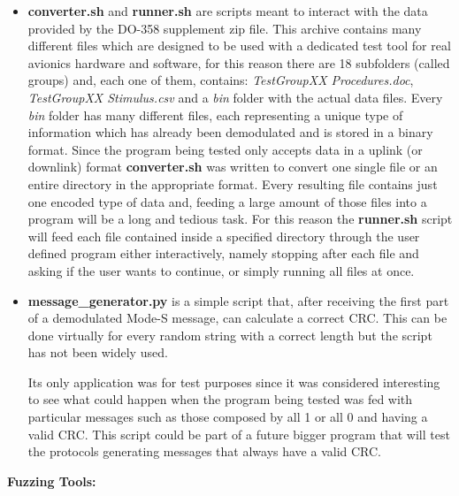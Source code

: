 \documentclass[../main.tex]{subfiles}
\begin{document}
\begin{itemize}

  \item \textbf{converter.sh} and \textbf{runner.sh} are scripts meant to
  interact with the data provided by the DO-358 supplement zip file. This
  archive contains many different files which are designed to be used with a
  dedicated test tool for real avionics hardware and software, for this reason
  there are 18 subfolders (called groups) and,  each one of them, contains:
  \textit{TestGroupXX Procedures.doc}, \textit{TestGroupXX Stimulus.csv} and a
  \textit{bin} folder with the actual data files. Every \textit{bin} folder has
  many different files, each representing a unique type of information which has
  already been demodulated and is stored in a binary format. Since the program
  being tested only accepts data in a uplink (or downlink) format
  \textbf{converter.sh} was written to convert one single file or an entire
  directory in the appropriate format. Every resulting file contains just one
  encoded type of data and, feeding a large amount of those files into a
  program will be a long and tedious task. For this reason the
  \textbf{runner.sh} script will feed each file contained inside a specified
  directory through the user defined program either interactively, namely
  stopping after each file and asking if the user wants to continue, or simply
  running all files at once.

  \item \textbf{message\_generator.py} is a simple script that, after receiving
  the first part of a demodulated Mode-S message, can calculate a correct CRC.
  This can be done virtually for every random string with a correct length but
  the script has not been widely used.

  Its only application was for test purposes since it was considered interesting
  to see what could happen when the program being tested was fed with particular
  messages such as those composed by all 1 or all 0 and having a valid CRC. This
  script could be part of a future bigger program that will test the protocols
  generating messages that always have a valid CRC.

\end{itemize}

\bigskip
\textbf{Fuzzing Tools:}
\end{document}
